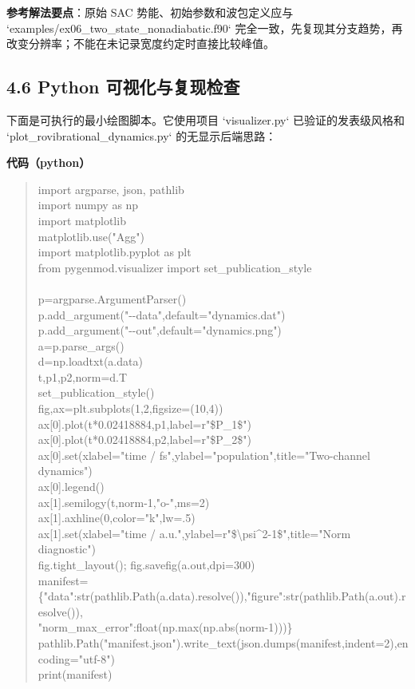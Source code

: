 \documentclass[UTF8,openany,11pt,fontset=fandol]{ctexbook}
\begin{document}
\textbf{参考解法要点}：原始 SAC 势能、初始参数和波包定义应与
`examples/ex06\_two\_state\_nonadiabatic.f90`
完全一致，先复现其分支趋势，再改变分辨率；不能在未记录宽度约定时直接比较峰值。

\subsection{\texorpdfstring{\textbf{4.6 Python
可视化与复现检查}}{4.6 Python 可视化与复现检查}}\label{python-ux53efux89c6ux5316ux4e0eux590dux73b0ux68c0ux67e5}

下面是可执行的最小绘图脚本。它使用项目 `visualizer.py`
已验证的发表级风格和 `plot\_rovibrational\_dynamics.py`
的无显示后端思路：

\textbf{代码（python）}

\begin{quote}
import argparse, json, pathlib\\
import numpy as np\\
import matplotlib\\
matplotlib.use("Agg")\\
import matplotlib.pyplot as plt\\
from pygenmod.visualizer import set\_publication\_style\\
~\\
p=argparse.ArgumentParser()\\
p.add\_argument("-\/-data",default="dynamics.dat")\\
p.add\_argument("-\/-out",default="dynamics.png")\\
a=p.parse\_args()\\
d=np.loadtxt(a.data)\\
t,p1,p2,norm=d.T\\
set\_publication\_style()\\
fig,ax=plt.subplots(1,2,figsize=(10,4))\\
ax{[}0{]}.plot(t*0.02418884,p1,label=r"\$P\_1\$")\\
ax{[}0{]}.plot(t*0.02418884,p2,label=r"\$P\_2\$")\\
ax{[}0{]}.set(xlabel="time / fs",ylabel="population",title="Two-channel
dynamics")\\
ax{[}0{]}.legend()\\
ax{[}1{]}.semilogy(t,norm-1,"o-",ms=2)\\
ax{[}1{]}.axhline(0,color="k",lw=.5)\\
ax{[}1{]}.set(xlabel="time /
a.u.",ylabel=r"\$\textbar\textbackslash psi\textbar\^{}2-1\$",title="Norm
diagnostic")\\
fig.tight\_layout(); fig.savefig(a.out,dpi=300)\\
manifest=\{"data":str(pathlib.Path(a.data).resolve()),"figure":str(pathlib.Path(a.out).resolve()),\\
"norm\_max\_error":float(np.max(np.abs(norm-1)))\}\\
pathlib.Path("manifest.json").write\_text(json.dumps(manifest,indent=2),encoding="utf-8")\\
print(manifest)
\end{quote}
\end{document}
